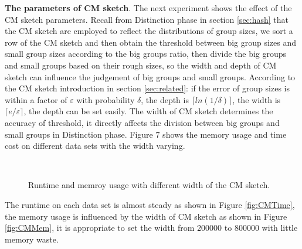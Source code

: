 \textbf{The parameters of CM sketch}. The next experiment shows the effect of the CM sketch parameters. Recall from Distinction phase in section \ref{sec:hash} that the CM sketch are employed to reflect the distributions of group sizes, we sort a row of the CM sketch and then obtain the threshold between big group sizes and small group sizes according to the big groups ratio, then divide the big groups and small groups based on their rough sizes, so the width and depth of CM sketch can influence the judgement of big groups and small groups. According to the CM sketch introduction in section \ref{sec:related}: if the error of group sizes is within a factor of $ \varepsilon $ with probability $ \delta$, the depth is $\lceil ln(1/\delta)\rceil $, the width is $\lceil e/\varepsilon\rceil $, the depth can be set easily. The width of CM sketch determines the accuracy of threshold, it directly affects the division between big groups and small groups in Distinction phase. Figure 7 shows the memory usage and time cost on different data sets with the width varying.
\begin{figure}[htbp]
	\label{fig: CMPara}
       \hspace{0.23cm}
    \\    
	\caption{Runtime and memroy usage with different width of the CM sketch.}	
	
\end{figure}

The runtime on each data set is almost steady as shown in Figure \ref{fig:CMTime}, the memory usage is influenced by the width of CM sketch as shown in Figure \ref{fig:CMMem}, it is appropriate to set the width from 200000 to 800000 with little memory waste.   

